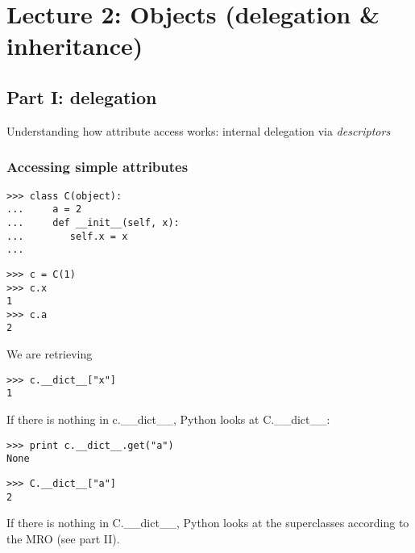 \documentclass[10pt,a4paper,english]{article}
\begin{document}

\hypertarget{lecture-2-objects-delegation-inheritance}{}
\section*{Lecture 2: Objects (delegation {\&} inheritance)}



\hypertarget{part-i-delegation}{}
\subsection*{Part I: delegation}

Understanding how attribute access works: internal delegation via \emph{descriptors}



\hypertarget{accessing-simple-attributes}{}
\subsubsection*{Accessing simple attributes}
\begin{verbatim}>>> class C(object):
...     a = 2
...     def __init__(self, x):
...        self.x = x
...\end{verbatim}
\begin{verbatim}>>> c = C(1)
>>> c.x
1
>>> c.a
2\end{verbatim}

We are retrieving
\begin{verbatim}>>> c.__dict__["x"]
1\end{verbatim}

If there is nothing in c.{\_}{\_}dict{\_}{\_}, Python looks at C.{\_}{\_}dict{\_}{\_}:
\begin{verbatim}>>> print c.__dict__.get("a")
None\end{verbatim}
\begin{verbatim}>>> C.__dict__["a"]
2\end{verbatim}

If there is nothing in C.{\_}{\_}dict{\_}{\_}, Python looks at the superclasses according
to the MRO (see part II).
\end{document}
